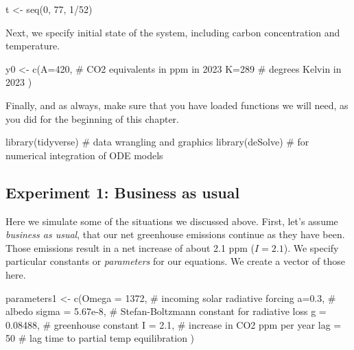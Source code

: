 \documentclass[
  letterpaper,
  DIV=11,
  numbers=noendperiod]{scrreprt}
\newenvironment{Shaded}{\begin{snugshade}}{\end{snugshade}}
\newcommand{\AttributeTok}[1]{\textcolor[rgb]{0.40,0.45,0.13}{#1}}
\newcommand{\CommentTok}[1]{\textcolor[rgb]{0.37,0.37,0.37}{#1}}
\newcommand{\DecValTok}[1]{\textcolor[rgb]{0.68,0.00,0.00}{#1}}
\newcommand{\FloatTok}[1]{\textcolor[rgb]{0.68,0.00,0.00}{#1}}
\newcommand{\FunctionTok}[1]{\textcolor[rgb]{0.28,0.35,0.67}{#1}}
\newcommand{\NormalTok}[1]{\textcolor[rgb]{0.00,0.23,0.31}{#1}}
\newcommand{\OtherTok}[1]{\textcolor[rgb]{0.00,0.23,0.31}{#1}}
\newcommand{\SpecialCharTok}[1]{\textcolor[rgb]{0.37,0.37,0.37}{#1}}
\begin{document}
\begin{Shaded}
\begin{Highlighting}[]
\NormalTok{t }\OtherTok{\textless{}{-}} \FunctionTok{seq}\NormalTok{(}\DecValTok{0}\NormalTok{, }\DecValTok{77}\NormalTok{, }\DecValTok{1}\SpecialCharTok{/}\DecValTok{52}\NormalTok{)}
\end{Highlighting}
\end{Shaded}

Next, we specify initial state of the system, including carbon
concentration and temperature.

\begin{Shaded}
\begin{Highlighting}[]
\NormalTok{y0 }\OtherTok{\textless{}{-}} \FunctionTok{c}\NormalTok{(}\AttributeTok{A=}\DecValTok{420}\NormalTok{, }\CommentTok{\# CO2 equivalents in ppm in 2023}
        \AttributeTok{K=}\DecValTok{289} \CommentTok{\# degrees Kelvin in 2023}
\NormalTok{        )}
\end{Highlighting}
\end{Shaded}

Finally, and as always, make sure that you have loaded functions we will
need, as you did for the beginning of this chapter.

\begin{Shaded}
\begin{Highlighting}[]
\FunctionTok{library}\NormalTok{(tidyverse) }\CommentTok{\# data wrangling and graphics}
\FunctionTok{library}\NormalTok{(deSolve) }\CommentTok{\# for numerical integration of ODE models}
\end{Highlighting}
\end{Shaded}

\subsection{Experiment 1: Business as
usual}\label{experiment-1-business-as-usual}

Here we simulate some of the situations we discussed above. First, let's
assume \emph{business as usual}, that our net greenhouse emissions
continue as they have been. Those emissions result in a net increase of
about 2.1 ppm (\(I=2.1\)). We specify particular constants or
\emph{parameters} for our equations. We create a vector of those here.

\begin{Shaded}
\begin{Highlighting}[]
\NormalTok{parameters1 }\OtherTok{\textless{}{-}} \FunctionTok{c}\NormalTok{(}\AttributeTok{Omega =} \DecValTok{1372}\NormalTok{, }\CommentTok{\# incoming solar radiative forcing}
       \AttributeTok{a=}\FloatTok{0.3}\NormalTok{, }\CommentTok{\# albedo}
       \AttributeTok{sigma =} \FloatTok{5.67e{-}8}\NormalTok{, }\CommentTok{\# Stefan{-}Boltzmann constant for radiative loss}
       \AttributeTok{g =} \FloatTok{0.08488}\NormalTok{, }\CommentTok{\# greenhouse constant}
       \AttributeTok{I =} \FloatTok{2.1}\NormalTok{, }\CommentTok{\# increase in CO2 ppm per year}
       \AttributeTok{lag =} \DecValTok{50} \CommentTok{\# lag time to partial temp equilibration}
\NormalTok{)}
\end{Highlighting}
\end{Shaded}
\end{document}
